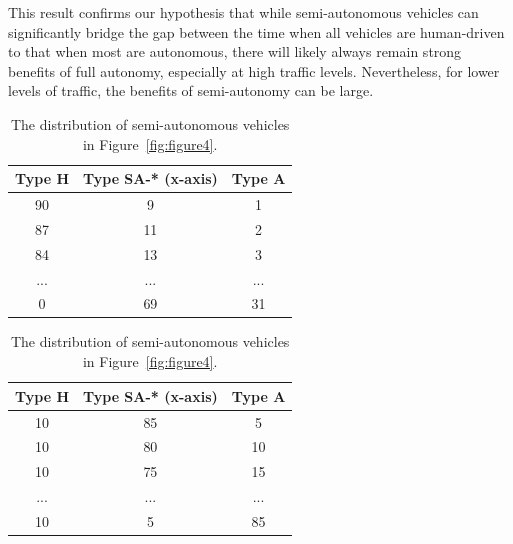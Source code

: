 This result confirms our hypothesis that while semi-autonomous
vehicles can significantly bridge the gap between the time when all
vehicles are human-driven to that when most are autonomous, there will
likely always remain strong benefits of full autonomy, especially at
high traffic levels.  Nevertheless, for lower levels of traffic, the
benefits of semi-autonomy can be large.


 

\begin{table}[t]
\caption{The distribution of semi-autonomous vehicles in Figure~\ref{fig:figure3}.}
\label{table:3}
\centering
\begin{tabular}{|c|c|c|}
    \hline
    Type H&  Type SA-* (x-axis)&    Type A\\
    \hline
    90&       9&    1\\
    \hline
    87&     11&    2\\
    \hline
    84&     13&    3\\
    \hline
     ...&   ...&   ...\\
    \hline
         0&     69&  31\\
    \hline
\end{tabular}

\mbox{}

\caption{The distribution of semi-autonomous vehicles in Figure~\ref{fig:figure4}.}
\label{table:4}
\centering
\begin{tabular}{|c|c|c|}
    \hline
     Type H&  Type SA-* (x-axis)&    Type A\\
    \hline
     10&     85&    5\\
    \hline
     10&     80&  10\\
    \hline
     10&     75&  15\\
    \hline
      ...&  ...&  ...\\
    \hline
        10&       5&  85\\
    \hline
\end{tabular}

\end{table}


